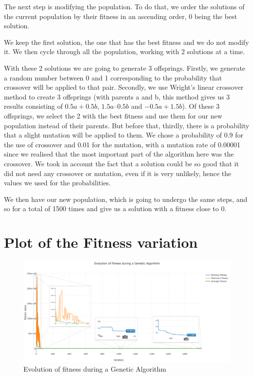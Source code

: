 \documentclass[12pt]{article}
\begin{document}
The next step is modifying the population. To do that, we order the solutions of the current population by their fitness in an ascending order, 0 being the best solution.

We keep the first solution, the one that has the best fitness and we do not modify it. We then cycle through all the population, working with 2 solutions at a time.

With these 2 solutions we are going to generate 3 offsprings. Firstly, we generate a random number between 0 and 1 corresponding to the probability that crossover will be applied to that pair. Secondly, we use Wright's linear crossover method to create 3 offsprings (with parents a and b, this method gives us 3 results consisting of $0.5a + 0.5b$, $1.5a – 0.5b$ and $-0.5a + 1.5b$). Of these 3 offsprings, we select the 2 with the best fitness and use them for our new population instead of their parents. But before that, thirdly, there is a probability that a slight mutation will be applied to them. We chose a probability of 0.9 for the use of crossover and 0.01 for the mutation, with a mutation rate of 0.00001 since we realised that the most important part of the algorithm here was the crossover. We took in account the fact that a solution could be so good that it did not need any crossover or mutation, even if it is very unlikely, hence the values we used for the probabilities.

We then have our new population, which is going to undergo the same steps, and so for a total of 1500 times and give us a solution with a fitness close to 0.

\section{Plot of the Fitness variation}

\begin{figure}[H]
	\centering
	\includegraphics[width=1.0\columnwidth]{./plot_fitness_evolution.png}
	\caption{Evolution of fitness during a Genetic Algorithm}
\end{figure}
\end{document}
